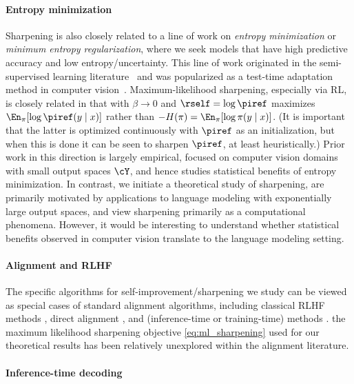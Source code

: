 \paragraph{Entropy minimization} Sharpening is also closely related to a line of work on \emph{entropy minimization} or \emph{minimum entropy regularization}, where we seek models that have high predictive accuracy and low entropy/uncertainty. This line of work originated in the semi-supervised learning literature~\citep{grandvalet2004semi} and was popularized as a test-time adaptation method in computer vision~\citep[c.f.,][]{wang2020tent,press2024entropy}. Maximum-likelihood sharpening, especially via RL, is closely related in that  with $\beta \to 0$ and $\rself=\log\piref$ maximizes $\En_\pi[\log\piref(y\mid{}x)]$ rather than $-H(\pi) = \En_\pi[\log \pi(y\mid{}x)]$. (It is important that the latter is optimized continuously with $\piref$ as an initialization, but when this is done it can be seen to sharpen $\piref$, at least heuristically.) Prior work in this direction is largely empirical, focused on computer vision domains with small output spaces $\cY$, and hence studies statistical benefits of entropy minimization. In contrast, we initiate a theoretical study of sharpening, are primarily motivated by applications to language modeling with exponentially large output spaces, and view sharpening primarily as a computational phenomena. However, it would be interesting to understand whether statistical benefits observed in computer vision translate to the language modeling setting. 








\paragraph{Alignment and RLHF}
The
specific algorithms for self-improvement/sharpening we study can be
viewed as special cases of standard alignment algorithms, including
classical RLHF methods
\citep{christiano2017deep,bai2022training,ouyang2022training}, direct
alignment \citep{rafailov2024direct}, and (inference-time or
training-time) \bestofn methods
\citep{amini2024variational,sessa2024bond,gui2024bonbon,pace2024west}. 
the maximum
likelihood sharpening objective \eqref{eq:ml_sharpening} used for our
theoretical results has been relatively unexplored within the
alignment literature.


\paragraph{Inference-time decoding}

